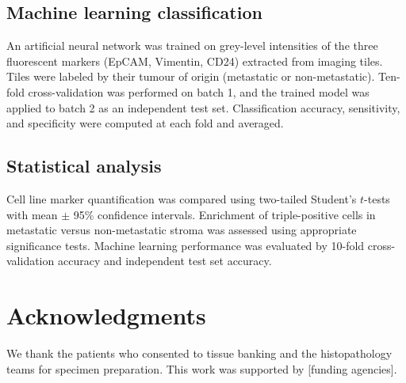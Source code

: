 \documentclass[11pt]{article}
\begin{document}
\subsection{Machine learning classification}

An artificial neural network was trained on grey-level intensities of the three fluorescent markers (EpCAM, Vimentin, CD24) extracted from imaging tiles. Tiles were labeled by their tumour of origin (metastatic or non-metastatic). Ten-fold cross-validation was performed on batch 1, and the trained model was applied to batch 2 as an independent test set. Classification accuracy, sensitivity, and specificity were computed at each fold and averaged.

\subsection{Statistical analysis}

Cell line marker quantification was compared using two-tailed Student's $t$-tests with mean $\pm$ 95\% confidence intervals. Enrichment of triple-positive cells in metastatic versus non-metastatic stroma was assessed using appropriate significance tests. Machine learning performance was evaluated by 10-fold cross-validation accuracy and independent test set accuracy.

\section{Acknowledgments}

We thank the patients who consented to tissue banking and the histopathology teams for specimen preparation. This work was supported by [funding agencies].



\end{document}
